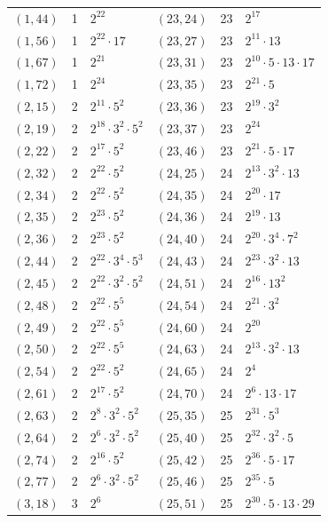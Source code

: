 \documentclass[11pt]{article}
\begin{document}
\begin{longtable}{@{}lrl@{\qquad}lrl@{}}
$(1,44)$ & 1 & $2^{22}$ & $(23,24)$ & 23 & $2^{17}$\\
$(1,56)$ & 1 & $2^{22}\cdot 17$ & $(23,27)$ & 23 & $2^{11}\cdot 13$\\
$(1,67)$ & 1 & $2^{21}$ & $(23,31)$ & 23 & $2^{10}\cdot 5\cdot 13\cdot 17$\\
$(1,72)$ & 1 & $2^{24}$ & $(23,35)$ & 23 & $2^{21}\cdot 5$\\
$(2,15)$ & 2 & $2^{11}\cdot 5^{2}$ & $(23,36)$ & 23 & $2^{19}\cdot 3^{2}$\\
$(2,19)$ & 2 & $2^{18}\cdot 3^{2}\cdot 5^{2}$ & $(23,37)$ & 23 & $2^{24}$\\
$(2,22)$ & 2 & $2^{17}\cdot 5^{2}$ & $(23,46)$ & 23 & $2^{21}\cdot 5\cdot 17$\\
$(2,32)$ & 2 & $2^{22}\cdot 5^{2}$ & $(24,25)$ & 24 & $2^{13}\cdot 3^{2}\cdot 13$\\
$(2,34)$ & 2 & $2^{22}\cdot 5^{2}$ & $(24,35)$ & 24 & $2^{20}\cdot 17$\\
$(2,35)$ & 2 & $2^{23}\cdot 5^{2}$ & $(24,36)$ & 24 & $2^{19}\cdot 13$\\
$(2,36)$ & 2 & $2^{23}\cdot 5^{2}$ & $(24,40)$ & 24 & $2^{20}\cdot 3^{4}\cdot 7^{2}$\\
$(2,44)$ & 2 & $2^{22}\cdot 3^{4}\cdot 5^{3}$ & $(24,43)$ & 24 & $2^{23}\cdot 3^{2}\cdot 13$\\
$(2,45)$ & 2 & $2^{22}\cdot 3^{2}\cdot 5^{2}$ & $(24,51)$ & 24 & $2^{16}\cdot 13^{2}$\\
$(2,48)$ & 2 & $2^{22}\cdot 5^{5}$ & $(24,54)$ & 24 & $2^{21}\cdot 3^{2}$\\
$(2,49)$ & 2 & $2^{22}\cdot 5^{5}$ & $(24,60)$ & 24 & $2^{20}$\\
$(2,50)$ & 2 & $2^{22}\cdot 5^{5}$ & $(24,63)$ & 24 & $2^{13}\cdot 3^{2}\cdot 13$\\
$(2,54)$ & 2 & $2^{22}\cdot 5^{2}$ & $(24,65)$ & 24 & $2^{4}$\\
$(2,61)$ & 2 & $2^{17}\cdot 5^{2}$ & $(24,70)$ & 24 & $2^{6}\cdot 13\cdot 17$\\
$(2,63)$ & 2 & $2^{8}\cdot 3^{2}\cdot 5^{2}$ & $(25,35)$ & 25 & $2^{31}\cdot 5^{3}$\\
$(2,64)$ & 2 & $2^{6}\cdot 3^{2}\cdot 5^{2}$ & $(25,40)$ & 25 & $2^{32}\cdot 3^{2}\cdot 5$\\
$(2,74)$ & 2 & $2^{16}\cdot 5^{2}$ & $(25,42)$ & 25 & $2^{36}\cdot 5\cdot 17$\\
$(2,77)$ & 2 & $2^{6}\cdot 3^{2}\cdot 5^{2}$ & $(25,46)$ & 25 & $2^{35}\cdot 5$\\
$(3,18)$ & 3 & $2^{6}$ & $(25,51)$ & 25 & $2^{30}\cdot 5\cdot 13\cdot 29$\\

\end{longtable}
\end{document}
